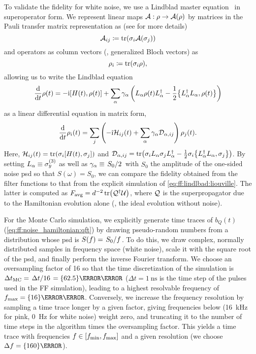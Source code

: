 To validate the fidelity for white noise, we use a Lindblad master equation~\cite{Lindblad1976,Gorini1976} in superoperator form.
We represent linear maps $\mathcal{A}: \rho\rightarrow\mathcal{A}(\rho)$ by matrices in the Pauli transfer matrix representation as (see  for more details)
\begin{equation}
    \mathcal{A}_{ij} \coloneqq \tr(\sigma_i\mathcal{A}(\sigma_j))
\end{equation}
and operators as column vectors (\ie, generalized Bloch vectors) as
\begin{equation}\label{eq:ff:bloch_vector}
    \rho_i \coloneqq \tr(\sigma_i\rho),
\end{equation}
allowing us to write the Lindblad equation
\begin{equation}\label{eq:ff:lindblad:hilbert}
\dv{t}\rho(t) = -\i\comm{H(t)}{\rho(t)} + \sum_\alpha \gamma_\alpha\left(L_\alpha\rho(t) L_\alpha\adjoint - \frac{1}{2}\acomm{L_\alpha\adjoint L_\alpha}{\rho(t)}\right)
\end{equation}
as a linear differential equation in matrix form,
\begin{equation}\label{eq:ff:lindlbad:liouville}
\dv{t}\rho_i(t) = \sum_j\left(-\mathrm{i}\mathcal{H}_{ij}(t)+ \sum_\alpha \gamma_\alpha \mathcal{D}_{\alpha, ij}\right)\rho_j(t).
\end{equation}
Here, $\mc{H}_{ij}(t) = \tr(\sigma_i\comm{H(t)}{\sigma_j})$ and $\mc{D}_{\alpha, ij} = \tr(\sigma_i L_\alpha\sigma_j L_\alpha\adjoint - \frac{1}{2}\sigma_i \acomm{L_\alpha\adjoint L_\alpha}{\sigma_j})$.
By setting $L_\alpha\equiv\sigma_y^{(3)}$ as well as $\gamma_\alpha\equiv\flatfrac{S_0}{2}$ with $S_0$ the amplitude of the one-sided noise \gls{psd} so that $S(\omega) = S_0$, we can compare the fidelity obtained from the filter functions to that from the explicit simulation of \cref{eq:ff:lindlbad:liouville}.
The latter is computed as $F_{\mathrm{avg}} = d^{-2}\tr(\mathcal{Q}^\dagger\mathcal{U})$, where $\mathcal{Q}$ is the superpropagator due to the Hamiltonian evolution alone (\ie, the ideal evolution without noise).

For the Monte Carlo simulation, we explicitly generate time traces of $b_Q(t)$ (\cf \cref{eq:ff:noise_hamiltonian:qft}) by drawing pseudo-random numbers from a distribution whose \gls{psd} is $S(f) = \flatfrac{S_0}{f}$.
To do this, we draw complex, normally distributed samples in frequency space (\ie white noise), scale it with the square root of the \gls{psd}, and finally perform the inverse Fourier transform.
We choose an oversampling factor of 16 so that the time discretization of the simulation is $\Delta t_\mr{MC} = \flatfrac{\Delta t}{16} = \qty{62.5}{\pico\second}$ ($\Delta t = \qty{1}{\nano\second}$ is the time step of the pulses used in the FF simulation), leading to a highest resolvable frequency of $\fmax = \qty{16}{\giga\hertz}$.
Conversely, we increase the frequency resolution by sampling a time trace longer by a given factor, giving frequencies below \fmin (\qty{16}{\kilo\hertz} for pink, \qty{0}{\hertz} for white noise) weight zero, and truncating it to the number of time steps in the algorithm times the oversampling factor.
This yields a time trace with frequencies $f\in [f_{\mathrm{min}}, f_{\mathrm{max}}]$ and a given resolution (we choose $\df = \qty{160}{\hertz}$).


